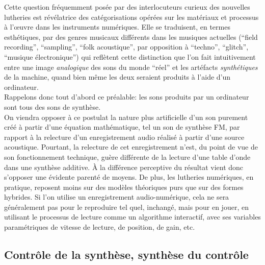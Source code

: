 \noindent {} Cette question fréquemment posée par des interlocuteurs curieux des nouvelles lutheries est révélatrice des catégorisations opérées sur les matériaux et processus à l'œuvre dans les instruments numériques. Elle se traduisent, en termes esthétiques, par des genres musicaux différents dans les musiques actuelles (``field recording'', ``sampling'', ``folk acoustique'', par opposition à ``techno'', ``glitch'', ``musique électronique'') qui reflètent cette distinction que l'on fait intuitivement entre une image \textit{analogique} des sons du monde ``réel'' et les artéfacts \textit{synthétiques} de la machine, quand bien même les deux seraient produits à l'aide d'un ordinateur.\\
\indent Rappelons donc tout d'abord ce préalable: les sons produits par un ordinateur sont tous des sons de synthèse.\\
\indent On viendra opposer à ce postulat la nature plus artificielle d'un son purement créé à partir d'une équation mathématique, tel un son de synthèse FM, par rapport à la relecture d'un enregistrement audio réalisé à partir d'une source acoustique. Pourtant, la relecture de cet enregistrement n'est, du point de vue de son fonctionnement technique, guère différente de la lecture d'une table d'onde dans une synthèse additive. À la différence perceptive du résultat vient donc s'opposer une évidente parenté de moyens. De plus, les lutheries numériques, en pratique, reposent moins sur des modèles théoriques purs que sur des formes hybrides. Si l'on utilise un enregistrement audio-numérique, cela ne sera généralement pas pour le reproduire tel quel, inchangé, mais pour en jouer, en utilisant le processus de lecture comme un algorithme interactif, avec ses variables paramétriques de vitesse de lecture, de position, de gain, etc.

\subsection{Contrôle de la synthèse, synthèse du contrôle}


